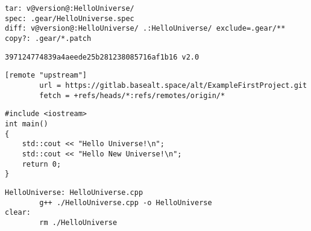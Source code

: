 \begin{verbatim}
tar: v@version@:HelloUniverse/
spec: .gear/HelloUniverse.spec
diff: v@version@:HelloUniverse/ .:HelloUniverse/ exclude=.gear/**
copy?: .gear/*.patch

\end{verbatim}

\begin{verbatim}
397124774839a4aeede25b281238085716af1b16 v2.0
\end{verbatim}

\begin{verbatim}
[remote "upstream"]
        url = https://gitlab.basealt.space/alt/ExampleFirstProject.git
        fetch = +refs/heads/*:refs/remotes/origin/*
\end{verbatim}

\begin{verbatim}
#include <iostream>
int main()
{
    std::cout << "Hello Universe!\n";
    std::cout << "Hello New Universe!\n";
    return 0;
}

\end{verbatim}

\begin{verbatim}
HelloUniverse: HelloUniverse.cpp
        g++ ./HelloUniverse.cpp -o HelloUniverse
clear:
        rm ./HelloUniverse
\end{verbatim}
